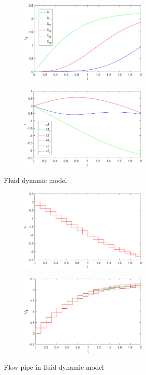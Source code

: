 \documentclass[runningheads,a4paper]{llncs}
\theoremstyle{definition}
\theoremstyle{plain}
\begin{document}
\begin{figure}[h]
\begin{subfigure}{.5\textwidth}
  \centering
   \includegraphics[width=6.5cm]{Fluidcomparek3x.eps}
   \parbox{4cm}{\subcaption{}}
\end{subfigure}%
\begin{subfigure}{.5\textwidth}
  \centering
  \includegraphics[width=6.5cm]{Fluidcomparek3z.eps}
  \parbox{4cm}{\subcaption{}}
\end{subfigure}
\caption{Fluid dynamic model}
\label{fig:sim_Fluid}
\end{figure}


\begin{figure}[h]
\begin{subfigure}{.5\textwidth}
  \centering
  \includegraphics[width=6.5cm]{Fluid_r.eps}
  \parbox{4cm}{\subcaption{}}
\end{subfigure}%
\begin{subfigure}{.5\textwidth}
  \centering
  \includegraphics[width=6.5cm]{Fluidflowpipe_compare.eps}
  \parbox{4cm}{\subcaption{}}
\end{subfigure}%
\caption{Flow-pipe in fluid dynamic model}
\label{fig:flowpipe_Fluid}
\end{figure}
\end{document}
